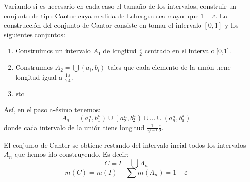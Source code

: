 \begin{problem}
Variando si es necesario en cada caso el tamaño de los intervalos, construir un conjunto de tipo Cantor cuya medida de Lebesgue sea mayor que $1-ε$.
\solution
La construcción del conjunto de Cantor consiste en tomar el intervalo $[0,1]$ y los siguientes conjuntos:
\begin{enumerate}
\item Construimos un intervalo $A_1$ de longitud $\frac{ε}{2}$ centrado en el intervalo [0,1].
\item Construimos $A_2 = \bigcup (a_i, b_i)$ tales que cada elemento de la unión tiene longitud igual a $\frac{1}{2}\frac{ε}{4}$.
\item etc
\end{enumerate}
Así, en el paso n-ésimo tenemos:
\[A_n = (a_1^n,b_1^n) \cup (a_2^n,b_2^n) \cup ... \cup (a_n^n,b_n^n)\]
donde cada intervalo de la unión tiene longitud $\frac{1}{2^{n-1}}\frac{ε}{2}$.

El conjunto de Cantor se obtiene restando del intervalo incial todos los intervalos $A_n$ que hemos ido construyendo. Es decir:
\[C = I -\bigcup A_n\]
\[m(C)=m(I)-\sum m(A_n) = 1 - ε\]
\end{problem}


